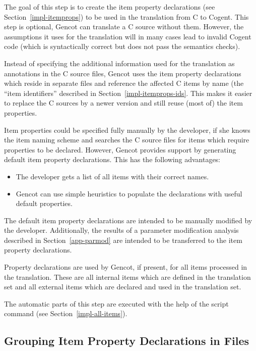 The goal of this step is to create the item property declarations (see Section~\ref{impl-itemprops})
to be used in the translation from C to Cogent. This step is optional, Gencot can translate a C source 
without them. However, the assumptions it uses for the translation will in many cases lead to 
invalid Cogent code (which is syntactically correct but does not pass the semantics checks).

Instead of specifying the additional information used for the translation as annotations in the C source files,
Gencot uses the item property declarations which reside in separate files and reference the affected C 
items by name (the ``item identifiers'' described in Section~\ref{impl-itemprops-ids}. This makes it 
easier to replace the C sources by a newer version and still reuse (most of) the item properties.

Item properties could be specified fully manually by the developer, if she knows the item naming scheme
and searches the C source files for items which require properties to be declared. However, Gencot provides
support by generating default item property declarations. This has the following advantages:
\begin{itemize}
\item The developer gets a list of all items with their correct names.
\item Gencot can use simple heuristics to populate the declarations with useful default properties.
\end{itemize}

The default item property declarations are intended to be manually modified by the developer. Additionally, the 
results of a parameter modification analysis described in Section~\ref{app-parmod} are intended to be transferred
to the item property declarations.

Property declarations are used by Gencot, if present, for all items processed in the translation. These are all internal items 
which are defined in the translation set and all external items which are declared and used in the translation set.

The automatic parts of this step are executed with the help of the script command  (see 
Section~\ref{impl-all-items}).

\subsection{Grouping Item Property Declarations in Files}
\label{app-itemprops-files}


